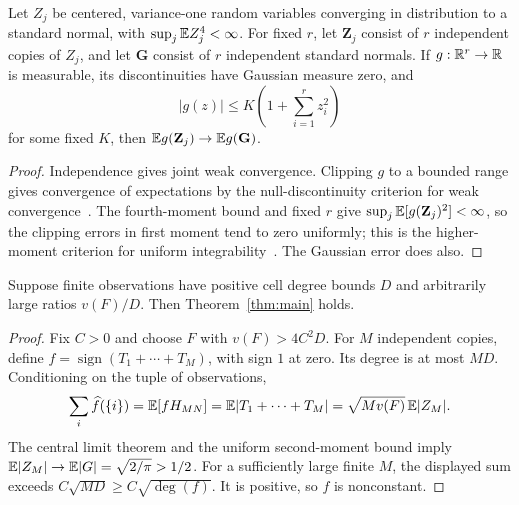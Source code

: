 \begin{lemma}\label{lem:transfer}
Let \(Z_j\) be centered, variance-one random variables converging in
distribution to a standard normal, with \(\sup_j\mathbb E Z_j^4<\infty\).
For fixed \(r\), let \(\mathbf Z_j\) consist of \(r\) independent copies
of \(Z_j\), and let \(\mathbf G\) consist of \(r\) independent standard
normals. If \(g:\mathbb R^r\to\mathbb R\) is measurable, its discontinuities have
Gaussian measure zero, and
\[
 |g(z)|\le K\left(1+\sum_{i=1}^r z_i^2\right)
\]
for some fixed \(K\), then \(\mathbb E g(\mathbf Z_j)\to\mathbb E g(\mathbf G)\).
\end{lemma}

\begin{proof}
Independence gives joint weak convergence. Clipping \(g\) to a bounded
range gives convergence of expectations by the null-discontinuity
criterion for weak convergence~\cite[Theorem~3.10.1(vi)]{Durrett}.
The fourth-moment bound and fixed \(r\)
give \(\sup_j\mathbb E[g(\mathbf Z_j)^2]<\infty\), so the clipping errors in
first moment tend to zero uniformly; this is the higher-moment
criterion for uniform integrability~\cite[Theorem~4.6.2]{Durrett}.
The Gaussian error does also.
\end{proof}

\begin{lemma}\label{lem:readout}
Suppose finite observations have positive cell degree bounds \(D\) and
arbitrarily large ratios \(v(F)/D\). Then Theorem~\ref{thm:main} holds.
\end{lemma}

\begin{proof}
Fix \(C>0\) and choose \(F\) with \(v(F)>4C^2D\).
For \(M\) independent copies, define
\(f=\operatorname{sign}(T_1+\cdots+T_M)\), with sign \(1\) at zero.
Its degree is at most \(MD\). Conditioning on the tuple of observations,
\[
 \sum_i\widehat f(\{i\})
 =\mathbb E[fH_{MN}]
 =\mathbb E|T_1+\cdots+T_M|
 =\sqrt{Mv(F)}\,\mathbb E|Z_M|.
\]
The central limit theorem and the uniform second-moment bound imply
\(\mathbb E|Z_M|\to\mathbb E|G|=\sqrt{2/\pi}>1/2\).
For a sufficiently large finite \(M\), the displayed sum exceeds
\(C\sqrt{MD}\ge C\sqrt{\deg(f)}\). It is positive, so \(f\) is
nonconstant.
\end{proof}

